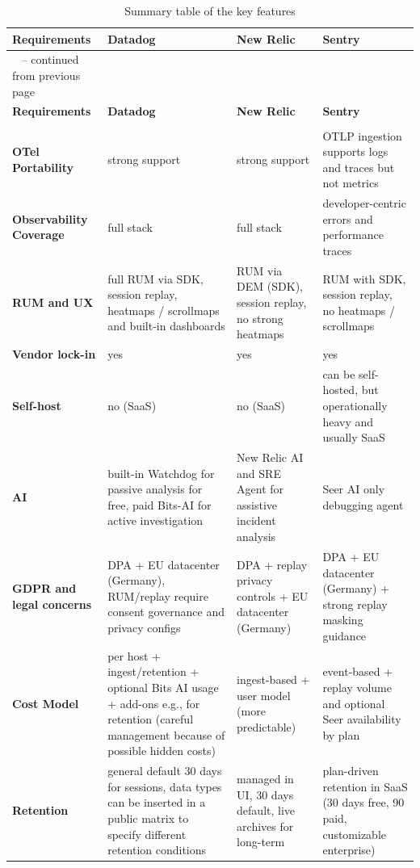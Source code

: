 \documentclass[12pt,a4paper,openright,twoside]{book}
\begin{document}
\begin{longtable}{|>{\centering\arraybackslash}p{3.5cm}|>{\centering\arraybackslash}p{3.5cm}|>{\centering\arraybackslash}p{3.5cm}|>{\centering\arraybackslash}p{3.5cm}|}
\caption{Summary table of the key features} \label{platfeats} \\
\hline
\textbf{Requirements} & \textbf{Datadog} & \textbf{New Relic} & \textbf{Sentry} \\
\hline
\endfirsthead

\multicolumn{4}{c}%
{\tablename\ \thetable{} -- continued from previous page} \\
\hline
\textbf{Requirements} & \textbf{Datadog} & \textbf{New Relic} & \textbf{Sentry} \\
\hline
\endhead

\hline
\multicolumn{4}{r}{Continued on next page} \\
\endfoot

\hline
\endlastfoot

\textbf{OTel Portability} & strong support & strong support & OTLP ingestion supports logs and traces but not metrics \\
\hline
\textbf{Observability Coverage} & full stack & full stack & developer-centric errors and performance traces \\
\hline
\textbf{RUM and UX} & full RUM via SDK, session replay, heatmaps / scrollmaps and built-in dashboards & RUM via DEM (SDK), session replay, no strong heatmaps & RUM with SDK, session replay, no heatmaps / scrollmaps \\
\hline
\textbf{Vendor lock-in} & yes & yes & yes \\
\hline
\textbf{Self-host} & no (SaaS) & no (SaaS) & can be self-hosted, but operationally heavy and usually SaaS \\
\hline
\textbf{AI} & built-in Watchdog for passive analysis for free, paid Bits-AI for active investigation & New Relic AI and SRE Agent for assistive incident analysis & Seer AI only debugging agent \\
\hline
\textbf{GDPR and legal concerns} & DPA + EU datacenter (Germany), RUM/replay require consent governance and privacy configs & DPA + replay privacy controls + EU datacenter (Germany) & DPA + EU datacenter (Germany) + strong replay masking guidance \\
\hline
\textbf{Cost Model} & per host + ingest/retention + optional Bits AI usage + add-ons e.g., for retention (careful management because of possible hidden costs) & ingest-based + user model (more predictable) & event-based + replay volume and optional Seer availability by plan \\
\hline
\textbf{Retention} & general default 30 days for sessions, data types can be inserted in a public matrix to specify different retention conditions & managed in UI, 30 days default, live archives for long-term & plan-driven retention in SaaS (30 days free, 90 paid, customizable enterprise) \\
\end{longtable}
\end{document}
